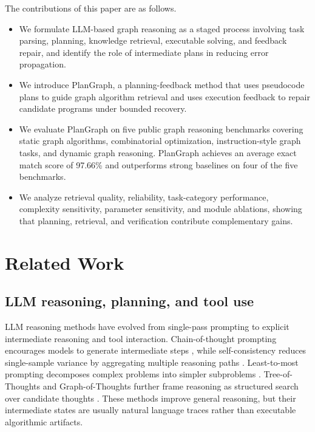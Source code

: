 \documentclass[pdflatex,sn-mathphys-num]{sn-jnl}
\theoremstyle{thmstyleone}
\theoremstyle{thmstyletwo}
\theoremstyle{thmstylethree}
\begin{document}
The contributions of this paper are as follows.
\begin{itemize}
\item We formulate LLM-based graph reasoning as a staged process involving task parsing, planning, knowledge retrieval, executable solving, and feedback repair, and identify the role of intermediate plans in reducing error propagation.
\item We introduce PlanGraph, a planning-feedback method that uses pseudocode plans to guide graph algorithm retrieval and uses execution feedback to repair candidate programs under bounded recovery.
\item We evaluate PlanGraph on five public graph reasoning benchmarks covering static graph algorithms, combinatorial optimization, instruction-style graph tasks, and dynamic graph reasoning. PlanGraph achieves an average exact match score of 97.66\% and outperforms strong baselines on four of the five benchmarks.
\item We analyze retrieval quality, reliability, task-category performance, complexity sensitivity, parameter sensitivity, and module ablations, showing that planning, retrieval, and verification contribute complementary gains.
\end{itemize}

\section{Related Work}\label{sec:related}

\subsection{LLM reasoning, planning, and tool use}

LLM reasoning methods have evolved from single-pass prompting to explicit intermediate reasoning and tool interaction. Chain-of-thought prompting encourages models to generate intermediate steps \cite{wei2022chain}, while self-consistency reduces single-sample variance by aggregating multiple reasoning paths \cite{wang2023selfconsistency}. Least-to-most prompting decomposes complex problems into simpler subproblems \cite{zhou2023least}. Tree-of-Thoughts and Graph-of-Thoughts further frame reasoning as structured search over candidate thoughts \cite{yao2023tree,besta2024graph}. These methods improve general reasoning, but their intermediate states are usually natural language traces rather than executable algorithmic artifacts.
\end{document}
